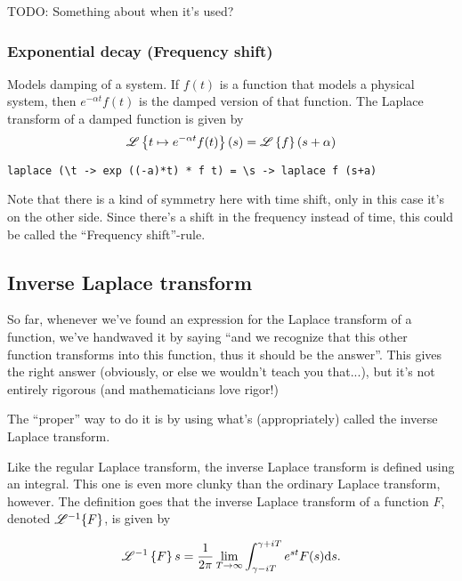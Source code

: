 
TODO: Something about when it's used? 

\subsubsection{Exponential decay (Frequency shift)} 

Models damping of a system. If $f(t)$ is a function that models a physical system, then $e^{-\alpha t}f(t)$ is the damped version of that function. The Laplace transform of a damped function is given by
\begin{equation*}
    \mathscr{L} \left\{ t \mapsto e^{-\alpha t} f(t)\right\}(s) = \mathscr{L}\left\{f\right\}(s+\alpha)
\end{equation*}

 
\begin{verbatim}
laplace (\t -> exp ((-a)*t) * f t) = \s -> laplace f (s+a)
\end{verbatim}

Note that there is a kind of symmetry here with time shift, only in this case it's on the other side. Since there's a shift in the frequency instead of time, this could be called the ``Frequency shift''-rule. 

\subsection{Inverse Laplace transform}  

So far, whenever we've found an expression for the Laplace transform of a function, we've handwaved it by saying ``and we recognize that this other function transforms into this function, thus it should be the answer''. This gives the right answer (obviously, or else we wouldn't teach you that...), but it's not entirely rigorous (and mathematicians love rigor!)

The ``proper'' way to do it is by using what's (appropriately) called the inverse Laplace transform.

Like the regular Laplace transform, the inverse Laplace transform is defined using an integral. This one is even more clunky than the ordinary Laplace transform, however. The definition goes that the inverse Laplace transform of a function $F$, denoted $\mathscr{L}^{-1}\{F\}$,  is given by

\begin{equation*}
    \mathscr{L}^{-1} \left\{F\right\} s = \frac{1}{2\pi} \lim_{T\to\infty} \int_{\gamma - iT}^{\gamma + iT} e^{st} F(s) \dd s.
\end{equation*}

